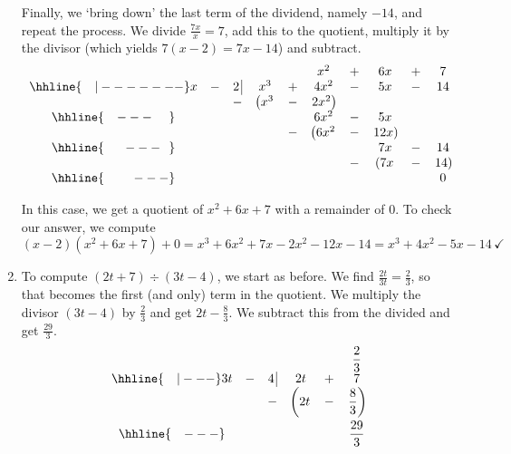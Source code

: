\begin{ex}
\begin{enumerate}
Finally, we `bring down' the last term of the dividend, namely $-14$, and repeat the process.  We divide $\frac{7x}{x} = 7$, add this to the quotient, multiply it by the divisor (which yields $7(x - 2) = 7x - 14$) and subtract.\setlength\arraycolsep{0.1pt}\setlength\extrarowheight{2pt}\[ \begin{array}{cccccccccc}

& & & & & x^2 & + & 6x & + & 7 \\ \hhline{~~~|-------}

x & - & 2 \, \vline& x^3 & + & 4x^2 & - & 5x & - & 14 \\

 &  &  -& \left(x^3 \right. & - & \left.  2x^2\right) &  &  &  &  \\ \hhline{~~~---~~~~} 
 &  &  &   &  & 6 x^2 & - & 5x &  &  \\ 
 &  &  &   & - & \left(6 x^2 \right. & - & \left. 12x \right) &  &  \\ \hhline{~~~~~---~~} 
 &  &  &   &   &  & & 7x  & - & 14 \\
 &  &  &   &   &  & - & \left( 7x \right. & - & \left. 14 \right) \\ \hhline{~~~~~~~---} 
 &   &  &  &  &  &  &  &  & 0
 
\end{array}\]
\setlength\arraycolsep{5pt}
\setlength\extrarowheight{0pt}

In this case, we get a quotient of $x^2 + 6x + 7$ with a remainder of $0$.  To check our answer, we compute  \[(x-2)\left(x^2 + 6x + 7\right) + 0 = x^3 + 6x^2 + 7x - 2x^2 - 12x -14 =  x^3 + 4x^2 - 5x - 14 \, \checkmark \]


\item    To compute  $\left(2t +  7\right) \div \left(3t - 4\right)$, we start as before.  We find $\frac{2t}{3t} = \frac{2}{3}$, so that becomes the first (and only) term in the quotient.  We multiply the divisor $(3t-4)$ by $\frac{2}{3}$ and get $2t - \frac{8}{3}$.  We subtract this from the divided and get $\frac{29}{3}$.\setlength\arraycolsep{0.1pt}\setlength\extrarowheight{5pt}\[ \begin{array}{cccccc}

& & & & & \dfrac{2}{3} \\ \hhline{~~~|---}

3t & - & 4 \, \vline& 2t & + & 7  \\

 &  &  -& \left(2t\vphantom{\dfrac{8}{3}} \right. & - & \left.  \dfrac{8}{3}\right)  \\ \hhline{~~~---}
 &  &  &   &  & \dfrac{29}{3} \vphantom{\sqrt{\dfrac{7}{7}}} \\ 


\end{array}\]
\end{enumerate}
\end{ex}
